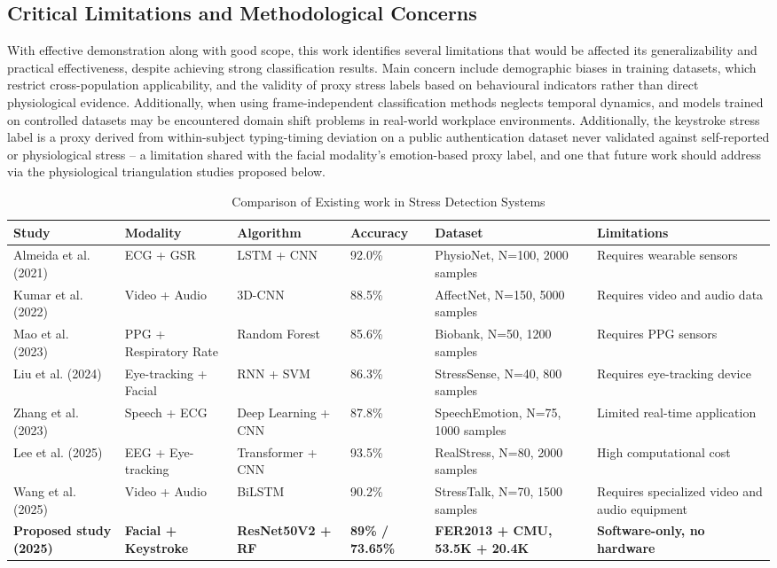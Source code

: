 \documentclass[fleqn,10pt]{wlscirep}
\begin{document}
\subsection*{Critical Limitations and Methodological Concerns}
With effective demonstration along with good scope, this work identifies several limitations that would be affected its generalizability and practical effectiveness, despite achieving strong classification results. Main concern include demographic biases in training datasets, which restrict cross-population applicability, and the validity of proxy stress labels based on behavioural indicators rather than direct physiological evidence. Additionally, when using frame-independent classification methods neglects temporal dynamics, and models trained on controlled datasets may be encountered domain shift problems in real-world workplace environments. Additionally, the keystroke stress label is a proxy derived from within-subject typing-timing deviation on a public authentication dataset never validated against self-reported or physiological stress -- a limitation shared with the facial modality's emotion-based proxy label, and one that future work should address via the physiological triangulation studies proposed below.
\begin{table}[htbp]
\centering
\caption{Comparison of Existing work in Stress Detection Systems}
\label{tab:related_work_comparison}
\begin{tabular}{p{2.5cm}p{2.5cm}p{2cm}p{1.5cm}p{3cm}p{4cm}}
\toprule
Study & Modality & Algorithm & Accuracy & Dataset & Limitations \\
\midrule
Almeida et al. (2021)~\cite{almeida2021} & ECG + GSR & LSTM + CNN & 92.0\% & PhysioNet, N=100, 2000 samples & Requires wearable sensors \\
Kumar et al. (2022)~\cite{kumar2022} & Video + Audio & 3D-CNN & 88.5\% & AffectNet, N=150, 5000 samples & Requires video and audio data \\
Mao et al. (2023)~\cite{mao2023} & PPG + Respiratory Rate & Random Forest & 85.6\% & Biobank, N=50, 1200 samples & Requires PPG sensors \\
Liu et al. (2024)~\cite{liu2024} & Eye-tracking + Facial & RNN + SVM & 86.3\% & StressSense, N=40, 800 samples & Requires eye-tracking device \\
Zhang et al. (2023)~\cite{zhang2023} & Speech + ECG & Deep Learning + CNN & 87.8\% & SpeechEmotion, N=75, 1000 samples & Limited real-time application \\
Lee et al. (2025)~\cite{lee2025} & EEG + Eye-tracking & Transformer + CNN & 93.5\% & RealStress, N=80, 2000 samples & High computational cost \\
Wang et al. (2025)~\cite{wang2025} & Video + Audio & BiLSTM & 90.2\% & StressTalk, N=70, 1500 samples & Requires specialized video and audio equipment \\
\textbf{Proposed study (2025)} & \textbf{Facial + Keystroke} & \textbf{ResNet50V2 + RF} & \textbf{89\% / 73.65\%} & \textbf{FER2013 + CMU, 53.5K + 20.4K} & \textbf{Software-only, no hardware} \\
\bottomrule
\end{tabular}
\end{table}
\end{document}
